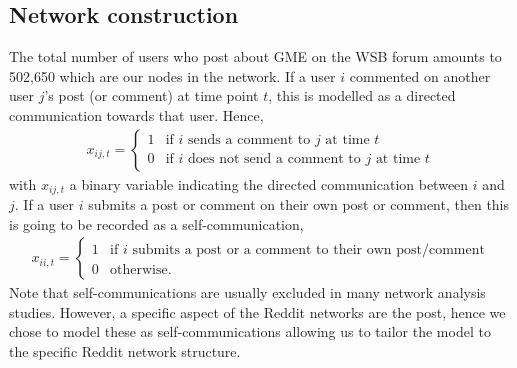 \subsection{Network construction}
The total number of users who post about GME on the WSB forum amounts to 502,650 which are our nodes in the network. If a user $i$ commented on another user $j$'s post (or comment) at time point $t$, this is modelled as a directed communication towards that user. Hence, 
\begin{align*}
	x_{ij,t} = 
	\begin{cases}
		1 & \text{if $i$ sends a comment to $j$ at time $t$} \\
		0 & \text{if $i$ does not send a comment to $j$ at time $t$}
	\end{cases}
\end{align*}
with $x_{ij,t}$ a binary variable indicating the directed communication between $i$ and $j$. If a user $i$ submits a post or comment on their own post or comment, then this is going to be recorded as a self-communication, 
\begin{align*}
	x_{ii,t} = 
	\begin{cases}
		1 & \text{if $i$ submits a post or a comment to their own post/comment} \\
		0 & \text{otherwise.}
	\end{cases}
\end{align*}
Note that self-communications are usually excluded in many network analysis studies. However, a specific aspect of the Reddit networks are the post, hence we chose to model these as self-communications allowing us to tailor the model to the specific Reddit network structure.

